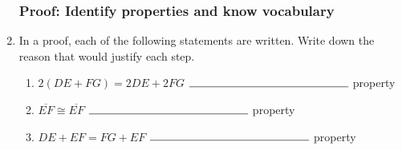 \documentclass[12pt, oneside]{article}
\begin{document}
\begin{enumerate}
\subsubsection*{Proof: Identify properties and know vocabulary}

  \item In a proof, each of the following statements are written. Write down the reason that would justify each step. \bigskip
    \begin{enumerate}
      \item $2(DE + FG)=2DE+2FG$  \hspace{0.6cm} $\rule{5cm}{0.15mm}$ property \bigskip
      \item $\overline{EF} \cong \overline{EF}$ \hspace{4cm} $\rule{5cm}{0.15mm}$ property \bigskip
      \item $DE+EF= FG+EF$  \hspace{1.7cm} $\rule{5cm}{0.15mm}$ property
    \end{enumerate}


  \end{enumerate}
\end{document}
